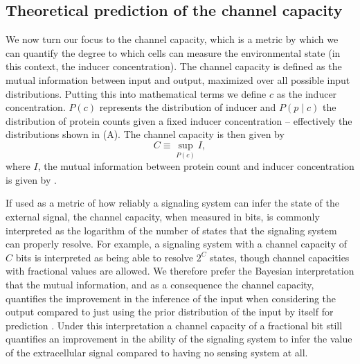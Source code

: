 \subsection{Theoretical prediction of the channel capacity}
\label{sec_channcap}

We now turn our focus to the channel capacity, which is a metric by which we
can quantify the degree to which cells can measure the environmental state (in
this context, the inducer concentration). The channel capacity is defined as
the mutual information between input and output, maximized over all possible
input distributions. Putting this into mathematical terms we define $c$ as the
inducer concentration. $P(c)$ represents the distribution of inducer and $P(p
\mid c)$ the distribution of protein counts given a fixed inducer concentration
-- effectively the distributions shown in (A). The channel
capacity is then given by
\begin{equation}
  C \equiv \sup_{P(c)} I,
  \label{eq_chann_cap}
\end{equation}
where $I$, the mutual information between protein count and inducer
concentration is given by .

If used as a metric of how reliably a signaling system can infer the state of
the external signal, the channel capacity, when measured in bits, is commonly
interpreted as the logarithm of the number of states that the signaling system
can properly resolve. For example, a signaling system with a channel capacity
of $C$ bits is interpreted as being able to resolve $2^C$ states, though
channel capacities with fractional values are allowed. We therefore prefer
the Bayesian interpretation that the mutual information, and as a consequence
the channel capacity, quantifies the improvement in the inference of the input
when considering the output compared to just using the prior distribution of
the input by itself for prediction \cite{Voliotis2014a, Bowsher2014}. Under
this interpretation a channel capacity of a fractional bit still quantifies an
improvement in the ability of the signaling system to infer the value of the
extracellular signal compared to having no sensing system at all.

